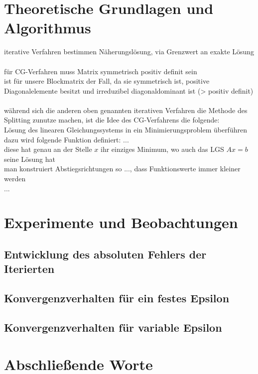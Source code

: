 \documentclass{scrartcl}
\begin{document}
\section{Theoretische Grundlagen und Algorithmus}
iterative Verfahren bestimmen Näherungslösung, via Grenzwert an exakte Lösung \\
\\
für CG-Verfahren muss Matrix symmetrisch positiv definit sein \\
ist für unsere Blockmatrix der Fall, da sie symmetrisch ist, positive Diagonalelemente besitzt und irreduzibel diagonaldominant ist (> positiv definit) \\
\\
während sich die anderen oben genannten iterativen Verfahren die Methode des Splitting zunutze machen, ist die Idee des CG-Verfahrens die folgende: \\
Lösung des linearen Gleichungssystems in ein Minimierungsproblem überführen \\
dazu wird folgende Funktion definiert: ... \\
diese hat genau an der Stelle $x$ ihr einziges Minimum, wo auch das LGS $Ax=b$ seine Lösung hat \\
man konstruiert Abstiegsrichtungen so ..., dass Funktionswerte immer kleiner werden \\
...

\pagebreak
\section{Experimente und Beobachtungen}


\pagebreak
\subsection{Entwicklung des absoluten Fehlers der Iterierten}


\pagebreak
\subsection{Konvergenzverhalten für ein festes Epsilon}


\pagebreak
\subsection{Konvergenzverhalten für variable Epsilon}




\pagebreak
\section{Abschließende Worte}
\end{document}
